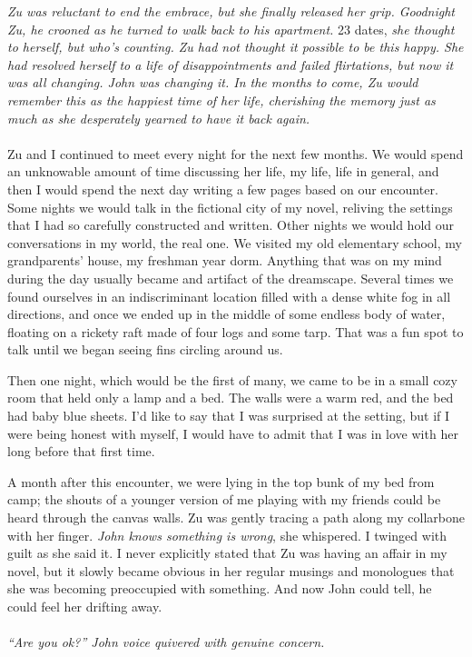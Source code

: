 \textit{	Zu was reluctant to end the embrace, but she finally released her grip. Goodnight Zu, he crooned as he turned to walk back to his apartment.} 23 dates, \textit{she thought to herself, but who’s counting. Zu had not thought it possible to be this happy. She had resolved herself to a life of disappointments and failed flirtations, but now it was all changing. John was changing it. In the months to come, Zu would remember this as the happiest time of her life, cherishing the memory just as much as she desperately yearned to have it back again.}
\\\\	
	Zu and I continued to meet every night for the next few months. We would spend an unknowable amount of time discussing her life, my life, life in general, and then I would spend the next day writing a few pages based on our encounter. Some nights we would talk in the fictional city of my novel, reliving the settings that I had so carefully constructed and written. Other nights we would hold our conversations in my world, the real one. We visited my old elementary school, my grandparents’ house, my freshman year dorm. Anything that was on my mind during the day usually became and artifact of the dreamscape. Several times we found ourselves in an indiscriminant location filled with a dense white fog in all directions, and once we ended up in the middle of some endless body of water, floating on a rickety raft made of four logs and some tarp. That was a fun spot to talk until we began seeing fins circling around us.
	
	Then one night, which would be the first of many, we came to be in a small cozy room that held only a lamp and a bed. The walls were a warm red, and the bed had baby blue sheets. I’d like to say that I was surprised at the setting, but if I were being honest with myself, I would have to admit that I was in love with her long before that first time.
	
	A month after this encounter, we were lying in the top bunk of my bed from camp; the shouts of a younger version of me playing with my friends could be heard through the canvas walls. Zu was gently tracing a path along my collarbone with her finger. \textit{John knows something is wrong}, she whispered. I twinged with guilt as she said it. I never explicitly stated that Zu was having an affair in my novel, but it slowly became obvious in her regular musings and monologues that she was becoming preoccupied with something. And now John could tell, he could feel her drifting away.
\\\\	
\textit{	“Are you ok?” John voice quivered with genuine concern.}
	
